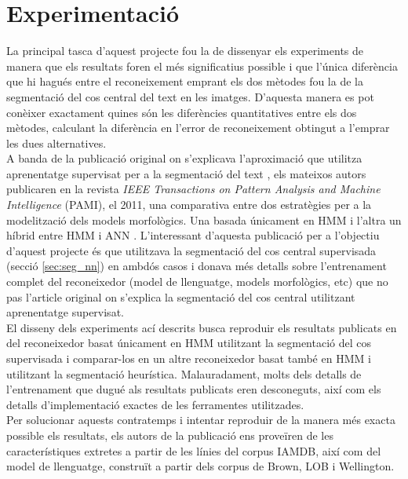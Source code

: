 \chapter{Experimentació} 
\label{cap:exp}
La principal tasca d'aquest projecte fou la de dissenyar els experiments de manera que els resultats foren el més significatius possible i que l'única diferència que hi hagués entre el reconeixement emprant els dos mètodes fou la de la segmentació del cos central del text en les imatges. D'aquesta manera es pot conèixer exactament quines són les diferències quantitatives entre els dos mètodes, calculant la diferència en l'error de reconeixement obtingut a l'emprar les dues alternatives.\\

A banda de la publicació original on s'explicava l'apro\-xi\-ma\-ció que utilitza aprenentatge supervisat per a la segmentació del text \cite{DBLP:conf/pris/Gorbe-MoyaEZB08}, els mateixos autors publicaren en la revista \emph{IEEE Transactions on Pattern Analysis and Machine Intelligence} (PAMI), el 2011, una comparativa entre dos estratègies per a la modelització dels models morfològics. Una basada únicament en HMM i l'altra un híbrid entre HMM i ANN \cite{espana2011improving}. L'interessant d'aquesta publicació per a l'objectiu d'aquest projecte és que utilitzava la segmentació del cos central supervisada (secció \ref{sec:seg_nn}) en ambdós casos i donava més detalls sobre l'entrenament complet del reconeixedor (model de llenguatge, models morfològics, etc) que no pas l'article original on s'explica la segmentació del cos central utilitzant aprenentatge supervisat.\\

El disseny dels experiments ací descrits busca reproduir els resultats publicats en \cite{espana2011improving} del reconeixedor basat únicament en HMM utilitzant la segmentació del cos supervisada i comparar-los en un altre reconeixedor basat també en HMM i utilitzant la segmentació heurística. Malauradament, molts dels detalls de l'entrenament que dugué als resultats publicats eren desconeguts, així com els detalls d'implementació exactes de les ferramentes utilitzades.\\

Per solucionar aquests contratemps i intentar reproduir de la manera més exacta possible els resultats, els autors de la publicació ens proveïren de les característiques extretes a partir de les línies del corpus IAMDB, així com del model de llenguatge, construït a partir dels corpus de Brown, LOB i Wellington.

